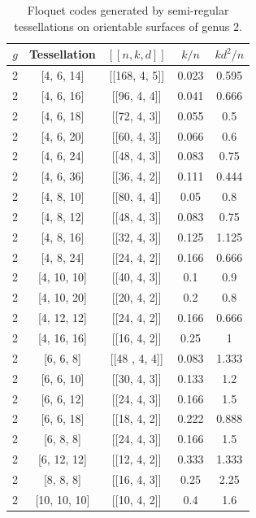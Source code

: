 \documentclass[%
reprint,
amsmath,amssymb,
aps,
]{revtex4-2}
\begin{document}
\begin{table}[b]
	\caption{	\label{tab:tess3}
		Floquet codes generated by semi-regular tessellations on orientable surfaces of genus $2$.}
	\begin{ruledtabular}
		\begin{tabular}{|c|c|c|c|c|}
			$g$ & Tessellation & $[[n,k,d]]$ & $k/n$ & $kd^{2}/n$ \\
			\hline
	2 & [4, 6, 14] & [[168, 4, 5]] & 0.023 & 0.595  \\
	2 & [4, 6, 16] & [[96, 4, 4]] & 0.041 & 0.666  \\
	2 & [4, 6, 18] & [[72, 4, 3]] & 0.055 & 0.5   \\
	2 & [4, 6, 20] & [[60, 4, 3]] & 0.066 & 0.6  \\
	2 & [4, 6, 24] & [[48, 4, 3]] & 0.083 & 0.75  \\
	2 & [4, 6, 36] & [[36, 4, 2]] & 0.111 & 0.444  \\
	2 & [4, 8, 10] & [[80, 4, 4]] & 0.05 & 0.8  \\
	2 & [4, 8, 12] & [[48, 4, 3]] & 0.083 & 0.75 \\
	2 & [4, 8, 16] & [[32, 4, 3]] & 0.125 & 1.125  \\
	2 & [4, 8, 24] & [[24, 4, 2]] & 0.166 & 0.666  \\
	2 & [4, 10, 10] & [[40, 4, 3]] & 0.1 & 0.9  \\
	2 & [4, 10, 20] & [[20, 4, 2]] & 0.2 & 0.8  \\
	2 & [4, 12, 12] & [[24, 4, 2]] & 0.166 & 0.666 \\
	2 & [4, 16, 16] & [[16, 4, 2]] & 0.25 & 1  \\
	2 & [6, 6, 8] & [[48 , 4, 4]] & 0.083 & 1.333 \\
	2 & [6, 6, 10] & [[30, 4, 3]] & 0.133 & 1.2 \\
	2 & [6, 6, 12] & [[24, 4, 3]] & 0.166 & 1.5  \\
	2 & [6, 6, 18] & [[18, 4, 2]] & 0.222 & 0.888  \\
	2 & [6, 8, 8] & [[24, 4, 3]] & 0.166 & 1.5  \\
	2 & [6, 12, 12] & [[12, 4, 2]] & 0.333 & 1.333  \\
	2 & [8, 8, 8] & [[16, 4, 3]] & 0.25 & 2.25  \\
	2 & [10, 10, 10] & [[10, 4, 2]] & 0.4 & 1.6 \\  
	\end{tabular}
\end{ruledtabular}
\end{table}
\end{document}
